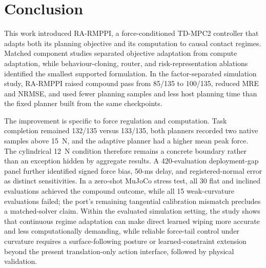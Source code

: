 \section{Conclusion}
\label{sec:conclusion}

This work introduced RA-RMPPI, a force-conditioned TD-MPC2 controller that
adapts both its planning objective and its computation to causal contact
regimes. Matched component studies separated objective adaptation from compute
adaptation, while behaviour-cloning, router, and risk-representation ablations
identified the smallest supported formulation. In the factor-separated
simulation study, RA-RMPPI raised compound pass from 85/135 to 100/135, reduced
MRE and NRMSE, and used fewer planning samples and less host planning time
than the fixed planner built from the same checkpoints.

The improvement is specific to force regulation and computation. Task
completion remained 132/135 versus 133/135, both planners recorded two native
samples above 15~N, and the adaptive planner had a higher mean peak force.
The cylindrical 12~N condition therefore remains a concrete boundary rather
than an exception hidden by aggregate results.  A 420-evaluation
deployment-gap panel further identified signed force bias, 50-ms delay, and
registered-normal error as distinct sensitivities. In a zero-shot MuJoCo
stress test, all 30 flat and inclined evaluations achieved the compound
outcome, while all 15 weak-curvature evaluations failed; the port's remaining
tangential calibration mismatch precludes a matched-solver claim. Within the
evaluated simulation setting, the study shows that continuous regime adaptation can
make direct learned wiping more accurate and less computationally demanding,
while reliable force-tail control under curvature requires a surface-following
posture or learned-constraint extension beyond the present translation-only
action interface, followed by physical validation.
